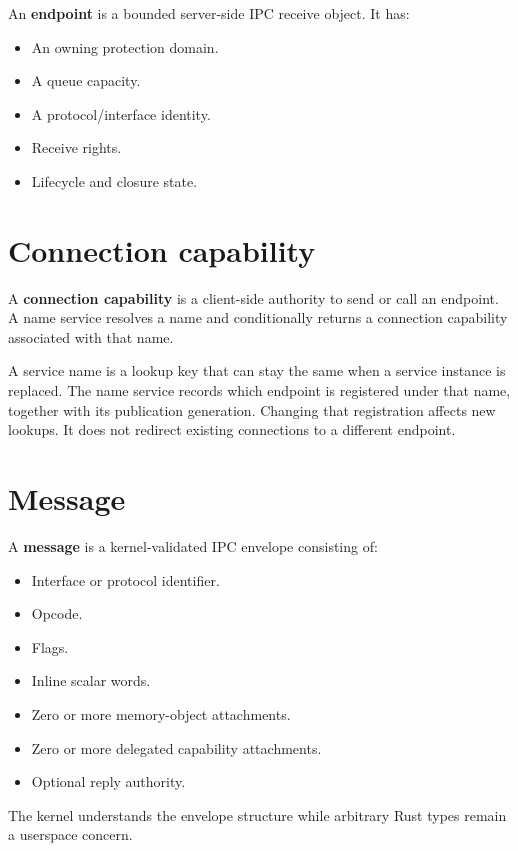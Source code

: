 An \textbf{endpoint} is a bounded server-side IPC receive object. It has:

\begin{itemize}
    \item An owning protection domain.
    \item A queue capacity.
    \item A protocol/interface identity.
    \item Receive rights.
    \item Lifecycle and closure state.
\end{itemize}

\section{Connection capability}

A \textbf{connection capability} is a client-side authority to send or call an
endpoint. A name service resolves a name and conditionally returns a connection
capability associated with that name.

A service name is a lookup key that can stay the same when a service instance
is replaced. The name service records which endpoint is registered under that
name, together with its publication generation. Changing that registration
affects new lookups. It does not redirect existing connections to a different
endpoint.

\section{Message}

A \textbf{message} is a kernel-validated IPC envelope consisting of:

\begin{itemize}
    \item Interface or protocol identifier.
    \item Opcode.
    \item Flags.
    \item Inline scalar words.
    \item Zero or more memory-object attachments.
    \item Zero or more delegated capability attachments.
    \item Optional reply authority.
\end{itemize}

The kernel understands the envelope structure while arbitrary Rust types remain a
userspace concern.

